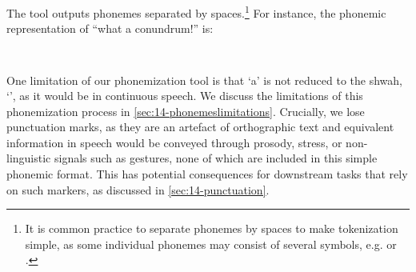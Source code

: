 The tool outputs phonemes separated by spaces.\footnote{It is common practice to separate phonemes by spaces to make tokenization simple, as some individual phonemes may consist of several symbols, e.g.  or .} For instance, the phonemic representation of ``what a conundrum!'' is:

\vspace{-2mm}
\begin{center}
\texttt{ \textvisiblespace~ \textvisiblespace~ \textvisiblespace~}
\end{center}
\vspace{-1mm}

\noindent
One limitation of our phonemization tool is that `a' is not reduced to the shwah, `', as it would be in continuous speech. We discuss the limitations of this phonemization process in \cref{sec:14-phonemeslimitations}. Crucially, we lose punctuation marks, as they are an artefact of orthographic text and equivalent information in speech would be conveyed through prosody, stress, or non-linguistic signals such as gestures, none of which are included in this simple phonemic format. This has potential consequences for downstream tasks that rely on such markers, as discussed in \cref{sec:14-punctuation}.

